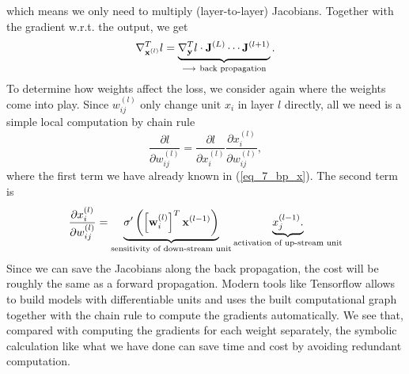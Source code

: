 \documentclass[../main.tex]{subfiles}
\begin{document}
which means we only need to multiply (layer-to-layer) Jacobians. Together with the gradient w.r.t. the output, we get
\begin{equation}\label{eq_7_bp_x}
\nabla_{{\bf x}^{(l)}}^Tl=	\underbrace{\nabla_{{\bf y}}^Tl\cdot {\bf J}^{(L)}\cdots {\bf J}^{(l+1)}}_{\longrightarrow\ \text{back propagation}}.
\end{equation}
To determine how weights affect the loss, we consider again where the weights come into play. Since $w_{ij}^{(l)}$ only change unit ${x}_i$ in layer $l$ directly, all we need is a simple local computation by chain rule
\begin{equation*}
\frac{\partial l}{\partial w_{ij}^{(l)}}=\frac{\partial l}{\partial x_i^{(l)}}\frac{\partial x_i^{(l)}}{\partial w_{ij}^{(l)}},
\end{equation*}
where the first term we have already known in (\ref{eq_7_bp_x}). The second term is
\begin{equation*}
\frac{\partial x_i^{(l)}}{\partial w_{ij}^{(l)}} = \underbrace{\sigma'\left(\left[{\bf w}_i^{(l)}\right]^T{\bf x}^{(l-1)}\right)}_{\text{sensitivity of down-stream unit}}\underbrace{x_j^{(l-1)}.}_{\text{activation of up-stream unit}}
\end{equation*}
Since we can save the Jacobians along the back propagation, the cost will be roughly the same as a forward propagation. Modern tools like Tensorflow allows to build models with differentiable units and uses the built computational graph together with the chain rule to compute the gradients automatically. We see that, compared with computing the gradients for each weight separately, the symbolic calculation like what we have done can save time and cost by avoiding redundant computation.
\end{document}
